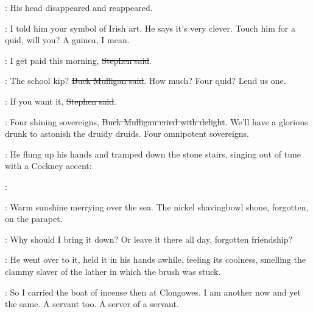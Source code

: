 :
His head disappeared and reappeared.

\Mulligan:
I told him your symbol of Irish art.
He says it's very clever.
Touch him for a quid, will you?
A guinea, I mean.

\Stephen:
I get paid this morning,
\sout{Stephen said}.

\Mulligan:
The school kip?
\sout{Buck Mulligan said}.
How much?
Four quid?
Lend us one.

\Stephen:
If you want it,
\sout{Stephen said}.

\Mulligan:
Four shining sovereigns,
\sout{Buck Mulligan cried with delight}.
We'll have a glorious drunk to astonish the druidy druids.
Four omnipotent sovereigns.

:
He flung up his hands
and tramped down the stone stairs,
singing out of tune
with a Cockney accent:

\Mulligan:
\begin{verse}
\end{verse}

:
Warm sunshine merrying over the sea.
The nickel shavingbowl shone,
forgotten,
on the parapet.

\StephenInt:
Why should I bring it down?
Or leave it there all day,
forgotten friendship?

:
He went over to it,
held it in his hands awhile,
feeling its coolness,
smelling the clammy slaver of the lather
in which the brush was stuck.

\StephenInt:
So I carried the boat of incense then at Clongowes.
I am another now and yet the same.
A servant too.
A server of a servant.
